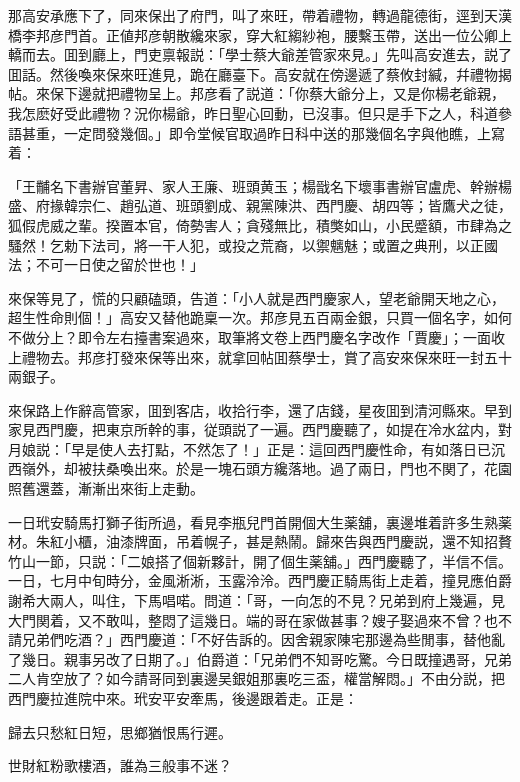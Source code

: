 那高安承應下了，同來保出了府門，叫了來旺，帶着禮物，轉過龍德街，逕到天漢橋李邦彦門首。正値邦彦朝散纔來家，穿大紅縐紗袍，腰繫玉帶，送出一位公卿上轎而去。囬到廳上，門吏禀報説：「學士蔡大爺差管家來見。」先叫高安進去，説了囬話。然後喚來保來旺進見，跪在廳臺下。高安就在傍邊遞了蔡攸封緘，幷禮物揭帖。來保下邊就把禮物呈上。邦彦看了説道：「你蔡大爺分上，又是你楊老爺親，我怎麽好受此禮物？況你楊爺，昨日聖心回動，已沒事。但只是手下之人，科道參語甚重，一定問發幾個。」即令堂候官取過昨日科中送的那幾個名字與他瞧，上寫着：

\begin{myquote}[\markfont]
「王黼名下書辦官董昇、家人王廉、班頭黄玉；楊戩名下壞事書辦官盧虎、幹辦楊盛、府掾韓宗仁、趙弘道、班頭劉成、親黨陳洪、西門慶、胡四等；皆鷹犬之徒，狐假虎威之輩。揆置本官，倚勢害人；貪殘無比，積獘如山，小民蹙額，巿肆為之騷然！乞勅下法司，將一干人犯，或投之荒裔，以禦魑魅；或置之典刑，以正國法；不可一日使之留於世也！」
\end{myquote}

來保等見了，慌的只顧磕頭，告道：「小人就是西門慶家人，望老爺開天地之心，超生性命則個！」高安又替他跪稟一次。邦彦見五百兩金銀，只買一個名字，如何不做分上？即令左右擡書案過來，取筆將文卷上西門慶名字改作「賈慶」；一面收上禮物去。邦彦打發來保等出來，就拿回帖囬蔡學士，賞了高安來保來旺一封五十兩銀子。

來保路上作辭高管家，囬到客店，收拾行李，還了店錢，星夜囬到清河縣來。早到家見西門慶，把東京所幹的事，従頭説了一遍。西門慶聽了，如提在冷水盆内，對月娘説：「早是使人去打點，不然怎了！」正是：這回西門慶性命，有如落日已沉西嶺外，却被扶桑喚出來。於是一塊石頭方纔落地。過了兩日，門也不関了，花園照舊還蓋，漸漸出來街上走動。

一日玳安騎馬打獅子街所過，看見李瓶兒門首開個大生薬舖，裏邊堆着許多生熟薬材。朱紅小櫃，油漆牌面，吊着幌子，甚是熱鬧。歸來告與西門慶説，還不知招贅竹山一節，只説：「二娘搭了個新夥計，開了個生薬舖。」西門慶聽了，半信不信。一日，七月中旬時分，金風淅淅，玉露泠泠。西門慶正騎馬街上走着，撞見應伯爵謝希大兩人，叫住，下馬唱喏。問道：「哥，一向怎的不見？兄弟到府上幾遍，見大門関着，又不敢叫，整悶了這幾日。端的哥在家做甚事？嫂子娶過來不曾？也不請兄弟們吃酒？」西門慶道：「不好告訴的。因舍親家陳宅那邊為些閒事，替他亂了幾日。親事另改了日期了。」伯爵道：「兄弟們不知哥吃驚。今日既撞遇哥，兄弟二人肯空放了？如今請哥同到裏邊吴銀姐那裏吃三盃，權當解悶。」不由分説，把西門慶拉進院中來。玳安平安牽馬，後邊跟着走。正是：

\begin{myquote}
歸去只愁紅日短，思鄉猶恨馬行遲。

世財紅粉歌樓酒，誰為三般事不迷？
\end{myquote}

